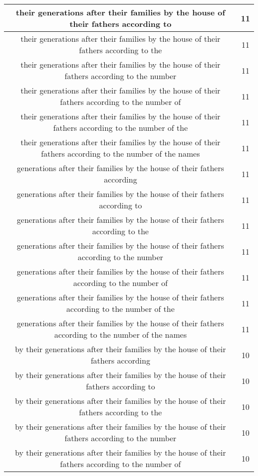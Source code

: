 \begin{center}
\begin{longtable}{|c|c|}
their generations after their families by the house of their fathers according to & 11\\ \hline 
their generations after their families by the house of their fathers according to the & 11\\ \hline 
their generations after their families by the house of their fathers according to the number & 11\\ \hline 
their generations after their families by the house of their fathers according to the number of & 11\\ \hline 
their generations after their families by the house of their fathers according to the number of the & 11\\ \hline 
their generations after their families by the house of their fathers according to the number of the names & 11\\ \hline 
generations after their families by the house of their fathers according & 11\\ \hline 
generations after their families by the house of their fathers according to & 11\\ \hline 
generations after their families by the house of their fathers according to the & 11\\ \hline 
generations after their families by the house of their fathers according to the number & 11\\ \hline 
generations after their families by the house of their fathers according to the number of & 11\\ \hline 
generations after their families by the house of their fathers according to the number of the & 11\\ \hline 
generations after their families by the house of their fathers according to the number of the names & 11\\ \hline 
by their generations after their families by the house of their fathers according & 10\\ \hline 
by their generations after their families by the house of their fathers according to & 10\\ \hline 
by their generations after their families by the house of their fathers according to the & 10\\ \hline 
by their generations after their families by the house of their fathers according to the number & 10\\ \hline 
by their generations after their families by the house of their fathers according to the number of & 10\\ \hline 

\end{longtable}
\end{center}

